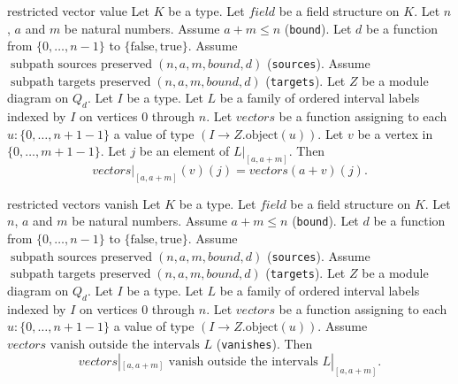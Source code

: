 \begin{cleanresult}{restricted vector value}
Let $K$ be a type.
Let $\mathit{field}$ be a field structure on $K$.
Let $n$, $a$ and $m$ be natural numbers.
Assume $a + m \le n$ (\texttt{bound}).
Let $d$ be a function from $\{0,\ldots,n-1\}$ to $\{\mathrm{false},\mathrm{true}\}$.
Assume $\operatorname{subpath\ sources\ preserved}(n, a, m, \mathit{bound}, d)$ (\texttt{sources}).
Assume $\operatorname{subpath\ targets\ preserved}(n, a, m, \mathit{bound}, d)$ (\texttt{targets}).
Let $Z$ be a module diagram on $Q_{d}$.
Let $I$ be a type.
Let $L$ be a family of ordered interval labels indexed by $I$ on vertices $0$ through $n$.
Let $\mathit{vectors}$ be a function assigning to each $u : \{0,\ldots,n + 1-1\}$ a value of type $(I\to Z.\mathrm{object}(u))$.
Let $v$ be a vertex in $\{0,\ldots,m + 1-1\}$.
Let $j$ be an element of $L|_{[a,a+m]}$.
Then \[\mathit{vectors}|_{[a,a+m]}(v)(j) = \mathit{vectors}(a+v)(j).\]
\end{cleanresult}

\begin{cleanresult}{restricted vectors vanish}
Let $K$ be a type.
Let $\mathit{field}$ be a field structure on $K$.
Let $n$, $a$ and $m$ be natural numbers.
Assume $a + m \le n$ (\texttt{bound}).
Let $d$ be a function from $\{0,\ldots,n-1\}$ to $\{\mathrm{false},\mathrm{true}\}$.
Assume $\operatorname{subpath\ sources\ preserved}(n, a, m, \mathit{bound}, d)$ (\texttt{sources}).
Assume $\operatorname{subpath\ targets\ preserved}(n, a, m, \mathit{bound}, d)$ (\texttt{targets}).
Let $Z$ be a module diagram on $Q_{d}$.
Let $I$ be a type.
Let $L$ be a family of ordered interval labels indexed by $I$ on vertices $0$ through $n$.
Let $\mathit{vectors}$ be a function assigning to each $u : \{0,\ldots,n + 1-1\}$ a value of type $(I\to Z.\mathrm{object}(u))$.
Assume $\mathit{vectors}\text{ vanish outside the intervals }L$ (\texttt{vanishes}).
Then \[\mathit{vectors}|_{[a,a+m]}\text{ vanish outside the intervals }L|_{[a,a+m]}.\]
\end{cleanresult}

